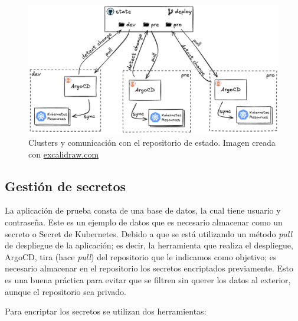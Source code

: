 \begin{figure}
  \centerline{\includegraphics[width=15cm]{figuras/clusters}}
  \caption{Clusters y comunicación con el repositorio de estado. Imagen creada con \href{https://excalidraw.com}{excalidraw.com}}
  \label{fig:clusters}
\end{figure}

\subsection*{Gestión de secretos}
\label{subsec:secretos}

La aplicación de prueba consta de una base de datos, la cual tiene usuario y contraseña. Este es un ejemplo de datos que es necesario almacenar como un secreto o Secret de Kubernetes. Debido a que se está utilizando un método \textit{pull}\cite{pull} de despliegue de la aplicación; es decir, la herramienta que realiza el despliegue, ArgoCD, tira (hace \textit{pull}) del repositorio que le indicamos como objetivo; es necesario almacenar en el repositorio los secretos encriptados previamente. Esto es una buena práctica para evitar que se filtren sin querer los datos al exterior, aunque el repositorio sea privado.

Para encriptar los secretos se utilizan dos herramientas:

